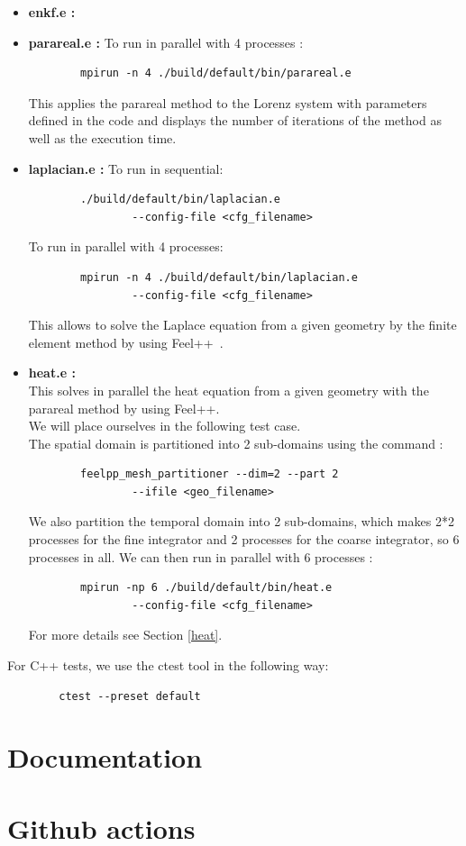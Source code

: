 \begin{enumerate}[label=\textbullet]
		\begin{itemize}[label=-]
			\item \textbf{enkf.e : } 
			\item \textbf{parareal.e : } To run in parallel with 4 processes :
\begin{lstlisting}
		mpirun -n 4 ./build/default/bin/parareal.e
\end{lstlisting}
			This applies the parareal method to the Lorenz system with parameters defined in the code and displays the number of iterations of the method as well as the execution time. 
			\item \textbf{laplacian.e : } To run in sequential:
\begin{lstlisting}
		./build/default/bin/laplacian.e 
				--config-file <cfg_filename>
\end{lstlisting}
			To run in parallel with 4 processes:
\begin{lstlisting}
		mpirun -n 4 ./build/default/bin/laplacian.e 
				--config-file <cfg_filename>
\end{lstlisting}
			This allows to solve the Laplace equation from a given geometry by the finite element method by using Feel++~\cite{feelpp_laplacian}.
			\item \textbf{heat.e : } \\
			This solves in parallel the heat equation from a given geometry with the parareal method by using Feel++. \\
			We will place ourselves in the following test case. \\
			The spatial domain is partitioned into 2 sub-domains using the command :
\begin{lstlisting}
		feelpp_mesh_partitioner --dim=2 --part 2 
				--ifile <geo_filename> 
\end{lstlisting}
			We also partition the temporal domain into 2 sub-domains, which makes 2*2 processes for the fine integrator and 2 processes for the coarse integrator, so 6 processes in all. We can then run in parallel with 6 processes :
\begin{lstlisting}
		mpirun -np 6 ./build/default/bin/heat.e 
				--config-file <cfg_filename>
\end{lstlisting}		
		For more details see Section \ref{heat}.
		\end{itemize}
		For C++ tests, we use the ctest tool in the following way:
\begin{lstlisting}
		ctest --preset default
\end{lstlisting}
	\end{enumerate}

\newpage

\section{Documentation}
\label{doc}

\newpage

\section{Github actions}
\label{ci}